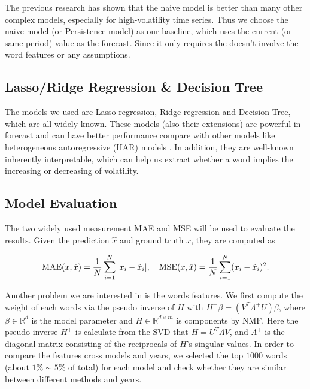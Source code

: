 \documentclass[11pt]{article}
\begin{document}
The previous research \cite{beck2025mind} has shown that the naive model is better than many other complex models, especially for high-volatility time series. Thus we choose the naive model (or Persistence model) as our baseline, which uses the current (or same period) value as the forecast. Since it only requires the  doesn't involve the word features or any assumptions.

\subsection{Lasso/Ridge Regression \& Decision Tree}

The models we used are Lasso regression, Ridge regression and Decision Tree, which are all widely known. These models (also their extensions) are powerful in forecast and can have better performance compare with other models like heterogeneous autoregressive (HAR) models \cite{liang2023forecasting} \cite{li2022forecasting} \cite{christensen2023machine}. In addition, they are well-known inherently interpretable, which can help us extract whether a word implies the increasing or decreasing of volatility.

\subsection{Model Evaluation}

The two widely used measurement MAE and MSE will be used to evaluate the results. Given the prediction $\hat{x}$ and ground truth $x$, they are computed as

$$
  \text{MAE}(x, \hat{x}) = \frac{1}{N} \sum_{i=1}^N \vert x_i - \hat{x}_i \vert,\quad \text{MSE}(x, \hat{x}) = \frac{1}{N} \sum_{i=1}^N  (x_i - \hat{x}_i)^2. \\
$$

Another problem we are interested in is the words features. We first compute the weight of each words via the pseudo inverse of $H$ with $H^+ \beta = (V^T \Lambda^+ U) \beta$, where $\beta \in \mathbb{R}^d$ is the model parameter and $H \in \mathbb{R}^{d \times m}$ is components by NMF. Here the pseudo inverse $H^+$ is calculate from the SVD that $H = U^T \Lambda V$, and $\Lambda^+$ is the diagonal matrix consisting of the reciprocals of $H$'s singular values. In order to compare the features cross models and years, we selected the top $1000$ words (about $1\% \sim 5\%$ of total) for each model and check whether they are similar between different methods and years.
\end{document}
